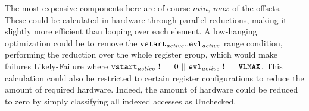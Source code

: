 The most expensive components here are of course $min,\,max$ of the offsets.
These could be calculated in hardware through parallel reductions, making it slightly more efficient than looping over each element.
A low-hanging optimization could be to remove the ${\texttt{vstart}}_{\mathit{active}}{}..{\texttt{evl}}_{\mathit{active}}{}$ range condition, performing the reduction over the whole register group, which would make failures Likely-Failure where $\vstartactive{}\ !=\ 0\ ||\ \evlactive{}\ !=\ \code{VLMAX}$.
This calculation could also be restricted to certain register configurations to reduce the amount of required hardware.
Indeed, the amount of hardware could be reduced to zero by simply classifying all indexed accesses as Unchecked.